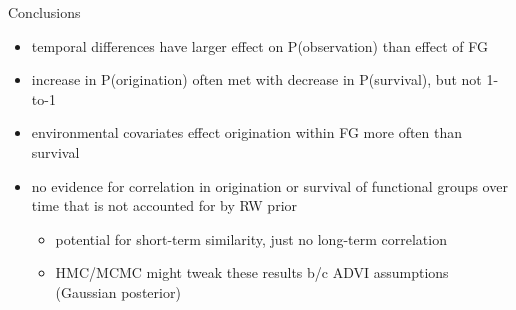 \documentclass[aspectratio=169]{beamer}
\begin{document}
\begin{frame}
  \begin{alertblock}{Conclusions}
    \begin{itemize}
      \item temporal differences have larger effect on P(observation) than effect of FG 
      \item increase in P(origination) often met with decrease in P(survival), but not 1-to-1
      \item environmental covariates effect origination within FG more often than survival
      \item no evidence for correlation in origination or survival of functional groups over time that is not accounted for by RW prior
        \begin{itemize}
          \item potential for short-term similarity, just no long-term correlation
          \item HMC/MCMC might tweak these results b/c ADVI assumptions (Gaussian posterior)
        \end{itemize}
    \end{itemize}
  \end{alertblock}
\end{frame}
\end{document}
